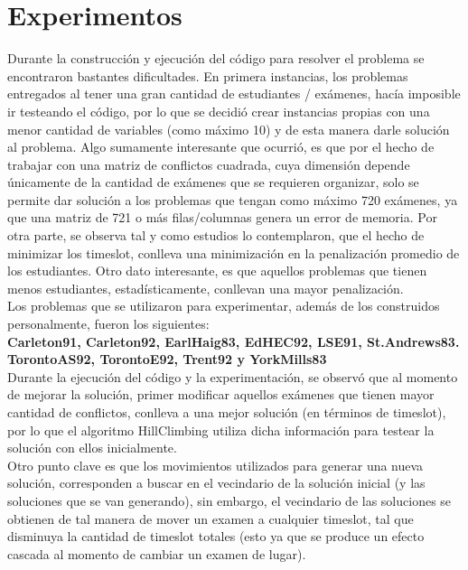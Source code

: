 \section{Experimentos}
Durante la construcción y ejecución del código para resolver el problema se encontraron bastantes dificultades. En primera instancias, los problemas entregados al tener una gran cantidad de estudiantes / exámenes, hacía imposible ir testeando el código, por lo que se decidió crear instancias propias con una menor cantidad de variables (como máximo 10) y de esta manera darle solución al problema. Algo sumamente interesante que ocurrió, es que por el hecho de trabajar con una matriz de conflictos cuadrada, cuya dimensión depende únicamente de la cantidad de exámenes que se requieren organizar, solo se permite dar solución a los problemas que tengan como máximo 720 exámenes, ya que una matriz de 721 o más filas/columnas genera un error de memoria. Por otra parte, se observa tal y como estudios lo contemplaron, que el hecho de minimizar los timeslot, conlleva una minimización en la penalización promedio de los estudiantes. Otro dato interesante, es que aquellos problemas que tienen menos estudiantes, estadísticamente, conllevan una mayor penalización.\\
Los problemas que se utilizaron para experimentar, además de los construidos personalmente, fueron los siguientes: \\
\textbf{Carleton91, Carleton92, EarlHaig83, EdHEC92, LSE91, St.Andrews83. TorontoAS92, TorontoE92, Trent92 y YorkMills83} \\
Durante la ejecución del código y la experimentación, se observó que al momento de mejorar la solución, primer modificar aquellos exámenes que tienen mayor cantidad de conflictos, conlleva a una mejor solución (en términos de timeslot), por lo que el algoritmo HillClimbing utiliza dicha información para testear la solución con ellos inicialmente. \\
Otro punto clave es que los movimientos utilizados para generar una nueva solución, corresponden a buscar en el vecindario de la solución inicial (y las soluciones que se van generando), sin embargo, el vecindario de las soluciones se obtienen de tal manera de mover un examen a cualquier timeslot, tal que disminuya la cantidad de timeslot totales (esto ya que se produce un efecto cascada al momento de cambiar un examen de lugar).

